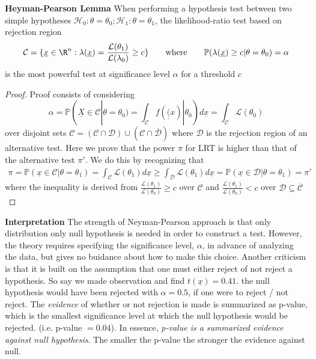 \documentclass[11pt]{article}
\begin{document}
\begin{theorem*}
  \textbf{Heyman-Pearson Lemma} When performing a hypothesis test between two simple hypotheses $\mathcal{H}_0: \theta = \theta_0; \mathcal{H}_1: \theta = \theta_1$, the likelihood-ratio test based on rejection region
  \[
    \mathcal{C} = \{ \underline{x}\in\R^n : \lambda(\underline{x}) = \frac{\mathcal{L}(\theta_1)}{\mathcal{L}(\lambda_0)} \geq c \} \quad\quad \text{where}\quad\quad \mathbb{P}(\lambda(\underline{x}) \geq c | \theta = \theta_0) = \alpha
  \]
  is the most powerful test at significance level $\alpha$ for a threshold $c$
  \begin{proof}
    Proof consists of considering
    \[
      \alpha = \mathbb{P}(\underline{X}\in \mathcal{C} | \theta = \theta_0) = \int_{\mathcal{C}} f(\underline(x)|\theta_0) d\underline{x} = \int_{\mathcal{C}}\mathcal{L}(\theta_0)
    \]
    over disjoint sets $\mathcal{C} = (\mathcal{C}\cap \mathcal{D}) \cup (\mathcal{C}\cap \overline{\mathcal{D}})$ where $\mathcal{D}$ is the rejection region of an alternative test. Here we prove that the power $\pi$ for LRT is higher than that of the alternative test $\pi'$. We do this by recognizing that
    \begin{align*}
      \pi = \mathbb{P}(\underline{x}\in \mathcal{C} | \theta = \theta_1) = \int_{\mathcal{C}}\mathcal{L}(\theta_1)d\underline{x} \geq \int_{\mathcal{D}}\mathcal{L}(\theta_1)d\underline{x} = \mathbb{P}(\underline{x}\in \mathcal{D} | \theta = \theta_1) = \pi'
    \end{align*}
    where the inequality is derived from $\frac{\mathcal{L}(\theta_1)}{\mathcal{L}(\theta_0)} \geq c$ over $\mathcal{C}$ and $\frac{\mathcal{L}(\theta_1)}{\mathcal{L}(\theta_0)} < c$ over $\mathcal{D}\subseteq \overline{\mathcal{C}}$


  \end{proof}
\end{theorem*}

\begin{rem}
  \textbf{Interpretation}
  The strength of Neyman-Pearson approach is that only distribution only null hypothesis is needed in order to construct a test. However, the theory requires specifying the significance level, $\alpha$, in advance of analyzing the data, but gives no buidance about how to make this choice. Another criticism is that it is built on the assumption that one must either reject of not reject a hypothesis. So say we made observation and find $t(\underline{x})  = 0.41$. the null hypothesis would have been rejected with $\alpha = 0.5$, if one were to reject / not reject. The \textit{evidence} of whether or not rejection is made is summarized as p-value, which is the smallest significance level at which the null hypothesis would be rejected. (i.e. p-value $ = 0.04$). In essence, \textit{p-value is a summarized evidence against null hypothesis}. The smaller the p-value the stronger the evidence against null.
\end{rem}
\end{document}
